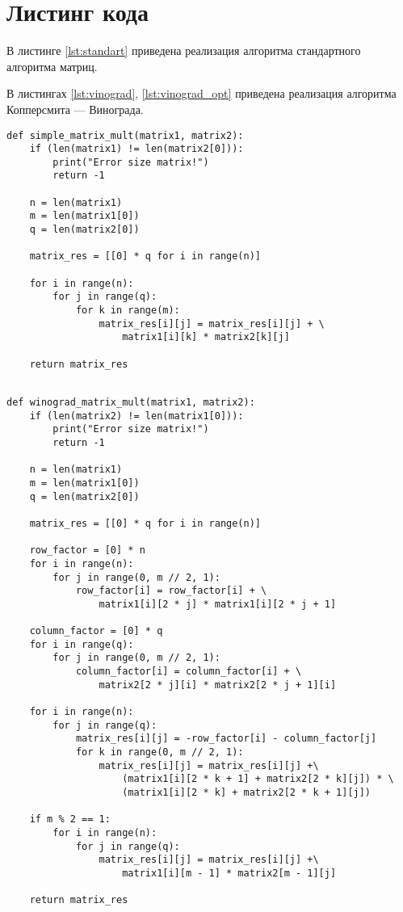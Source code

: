 \section{Листинг кода}

В листинге \ref{lst:standart} приведена реализация алгоритма стандартного алгоритма матриц.

В листингах \ref{lst:vinograd}, \ref{lst:vinograd_opt} приведена реализация алгоритма Копперсмита --- Винограда.


\begin{lstlisting}[label=lst:standart,caption=Реализация стандарного умножения матриц]
def simple_matrix_mult(matrix1, matrix2):
	if (len(matrix1) != len(matrix2[0])):
		print("Error size matrix!")
		return -1
	
	n = len(matrix1)
	m = len(matrix1[0])
	q = len(matrix2[0])
	
	matrix_res = [[0] * q for i in range(n)]
	
	for i in range(n):
		for j in range(q):
			for k in range(m):
				matrix_res[i][j] = matrix_res[i][j] + \
					matrix1[i][k] * matrix2[k][j]
				
	return matrix_res
	
\end{lstlisting}

\begin{lstlisting}[label=lst:vinograd,caption=Реализация алгоритма Копперсмита-Винограда]
def winograd_matrix_mult(matrix1, matrix2):
	if (len(matrix2) != len(matrix1[0])):
		print("Error size matrix!")
		return -1
	
	n = len(matrix1)
	m = len(matrix1[0])
	q = len(matrix2[0])
	
	matrix_res = [[0] * q for i in range(n)]
	
	row_factor = [0] * n
	for i in range(n):
		for j in range(0, m // 2, 1):
			row_factor[i] = row_factor[i] + \
				matrix1[i][2 * j] * matrix1[i][2 * j + 1]
	
	column_factor = [0] * q
	for i in range(q):
		for j in range(0, m // 2, 1):
			column_factor[i] = column_factor[i] + \
				matrix2[2 * j][i] * matrix2[2 * j + 1][i]
	
	for i in range(n):
		for j in range(q):
			matrix_res[i][j] = -row_factor[i] - column_factor[j]
			for k in range(0, m // 2, 1):
				matrix_res[i][j] = matrix_res[i][j] +\
					(matrix1[i][2 * k + 1] + matrix2[2 * k][j]) * \
					(matrix1[i][2 * k] + matrix2[2 * k + 1][j])
	
	if m % 2 == 1:
		for i in range(n):
			for j in range(q):
				matrix_res[i][j] = matrix_res[i][j] +\
					matrix1[i][m - 1] * matrix2[m - 1][j]
	
	return matrix_res
\end{lstlisting}

